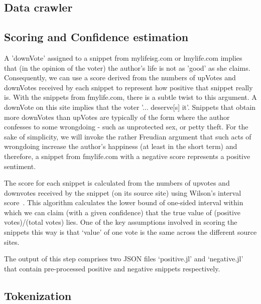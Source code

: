 \documentclass[11pt, letterpaper, conference, final, twocolumn]{ieeeconf}
\begin{document}
\subsection{Data crawler}
\label{ssec:crawler}

\subsection{Scoring and Confidence estimation}
\label{ssec:scoring}

A 'downVote' assigned to a snippet from mylifeisg.com or lmylife.com implies
that (in the opinion of the voter) the author's life is not as 'good' as she
claims. Consequently, we can use a score derived from the numbers of upVotes
and downVotes received by each snippet to represent how positive that snippet
really is. With the snippets from fmylife.com, there is a subtle twist to this
argument. A downVote on this site implies that the voter '... deserve[s] it'.
Snippets that obtain more downVotes than upVotes are typically of the form
where the author confesses to some wrongdoing - such as unprotected sex, or
petty theft. For the sake of simplicity, we will invoke the rather Freudian
argument that such acts of wrongdoing increase the author's happiness (at least
in the short term) and therefore, a snippet from fmylife.com with a negative
score represents a positive sentiment.

The score for each snippet is calculated from the numbers of upvotes and
downvotes received by the snippet (on its source site) using Wilson's interval score~\cite{miller_interval}. This algorithm calculates the lower bound of one-sided interval within which we
can claim (with a given confidence) that the true value of (positive
votes)/(total votes) lies. One of the key assumptions involved in scoring the snippets this way is that `value' of one vote is the same across the different source sites. 

The output of this step comprises two JSON files `positive.jl' and `negative.jl' that contain pre-processed positive and negative snippets respectively.

\subsection{Tokenization}
\label{ssec:tokenization}
\end{document}
